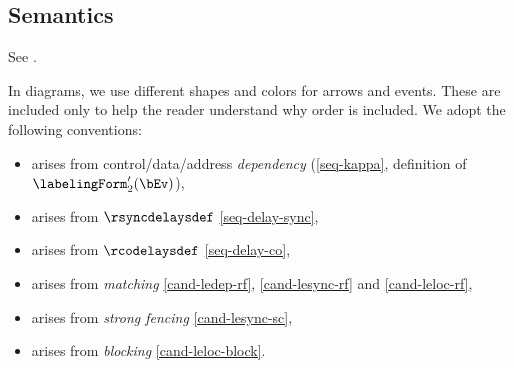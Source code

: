 
\subsection{Semantics}

%


See .

In diagrams, we use different shapes and colors for arrows and events.  These
are included only to help the reader understand why order is included.  We
adopt the following conventions:
\begin{itemize}  
\item \makebox{$\bEv\xpo\aEv$} arises from control/data/address \emph{dependency} (\ref{seq-kappa}, definition of $\labelingForm'_2(\bEv)$),
\item \makebox{$\bEv\xsync\aEv$} arises from $\rsyncdelaysdef$ \eqref{seq-delay-sync},
\item \makebox{$\bEv\xwki\aEv$} arises from $\rcodelaysdef$ \eqref{seq-delay-co},
\item \makebox{$\bEv\xrf\aEv$} arises from \emph{matching}
  \eqref{cand-ledep-rf}, \eqref{cand-lesync-rf} and \eqref{cand-leloc-rf},
\item \makebox{$\bEv\xsyncsc\aEv$} arises from \emph{strong fencing} \eqref{cand-lesync-sc},
\item \makebox{$\bEv\xwk\aEv$} arises from \emph{blocking} \eqref{cand-leloc-block}.
\end{itemize}


